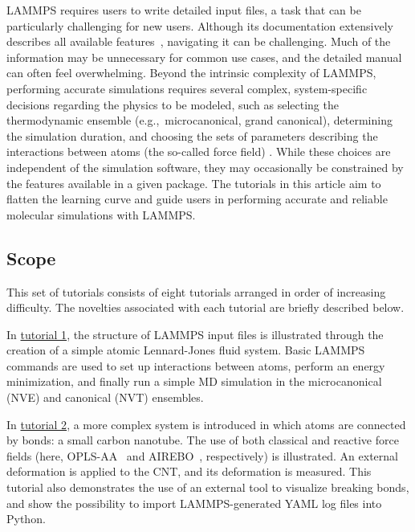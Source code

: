 \documentclass[9pt,tutorial]{livecoms}
\begin{document}
LAMMPS requires users to write detailed input files, a task that can be
particularly challenging for new users.  Although its documentation
extensively describes all available features~\cite{lammps_docs},
navigating it can be challenging.  Much of the information may be
unnecessary for common use cases, and the detailed manual can often feel
overwhelming.  Beyond the intrinsic complexity of LAMMPS, performing
accurate simulations requires several complex, system-specific decisions
regarding the physics to be modeled, such as selecting the thermodynamic
ensemble (e.g.,~microcanonical, grand canonical), determining the
simulation duration, and choosing the sets of parameters describing the
interactions between atoms (the so-called force field)
\cite{wong2016good, van2018validation, prasad2018best}.  While these
choices are independent of the simulation software, they may
occasionally be constrained by the features available in a given
package.  The tutorials in this article aim to flatten the learning
curve and guide users in performing accurate and reliable molecular
simulations with LAMMPS.

\subsection{Scope}

This set of tutorials consists of eight tutorials arranged in order of
increasing difficulty.  The novelties associated with each tutorial are
briefly described below.

In \hyperref[lennard-jones-label]{tutorial 1}, the structure of LAMMPS
input files is illustrated through the creation of a simple atomic
Lennard-Jones fluid system.  Basic LAMMPS commands are used to set up
interactions between atoms, perform an energy minimization, and finally
run a simple MD simulation in the microcanonical (NVE) and canonical (NVT)
ensembles.

In \hyperref[carbon-nanotube-label]{tutorial 2}, a more complex system
is introduced in which atoms are connected by bonds: a small carbon
nanotube.  The use of both classical and reactive force fields (here,
OPLS-AA~\cite{jorgensenDevelopmentTestingOPLS1996} and
AIREBO~\cite{stuart2000reactive}, respectively) is illustrated.  An
external deformation is applied to the CNT, and its deformation is
measured.  This tutorial also demonstrates the use of an external tool
to visualize breaking bonds, and show the possibility to import
LAMMPS-generated YAML log files into Python.
\end{document}

